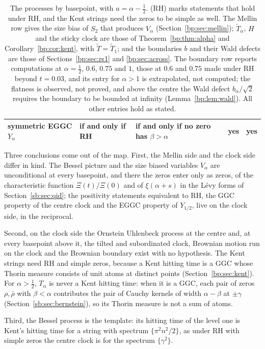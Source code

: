 \begin{table}[htbp]
\begin{tabular}{p{}p{}p{}p{}p{}}
\raggedright symmetric EGGC $Y_\alpha$ & \raggedright if and only if RH & \raggedright if and only if no zero has $\beta>\alpha$ & \raggedright yes & yes\tabularnewline
\bottomrule
\end{tabular}
\caption{The processes by basepoint, with $a=\alpha-\frac12$. (RH) marks statements that hold under RH, and the Kent strings need the zeros to be simple as well. The Mellin row gives the size bias of $S_2$ that produces $V_\alpha$ (Section~\ref{bp:sec:mellin}); $\widetilde T_\alpha$, $H$ and the sticky clock are those of Theorem~\ref{bp:thm:alpha} and Corollary~\ref{bp:cor:kent}, with $\widetilde T=\widetilde T_1$; and the boundaries $b$ and their Wald defects are those of Sections~\ref{bp:sec:rs1} and \ref{bp:sec:across}. The boundary row reports computations at $\alpha=\frac12$, $0.6$, $0.75$ and $1$, those at $0.6$ and $0.75$ made under RH beyond $t=0.03$, and its entry for $\alpha>1$ is extrapolated, not computed; the flatness is observed, not proved, and above the centre the Wald defect $b_\alpha/\sqrt2$ requires the boundary to be bounded at infinity (Lemma~\ref{bp:lem:wald}). All other entries hold as stated.}
\label{pm:tab:map}
\end{table}

Three conclusions come out of the map. First, the Mellin side and the clock side differ in kind. The Bessel picture and the size biased variables $V_\alpha$ are unconditional at every basepoint, and there the zeros enter only as zeros, of the characteristic function $\Xi(t)/\Xi(0)$ and of $\xi(\alpha+s)$ in the L\'evy forms of Section~\ref{sb:sec:qid}; the positivity statements equivalent to RH, the GGC property of the centre clock and the EGGC property of $Y_{1/2}$, live on the clock side, in the reciprocal.

Second, on the clock side the Ornstein Uhlenbeck process at the centre and, at every basepoint above it, the tilted and subordinated clock, Brownian motion run on the clock and the Brownian boundary exist with no hypothesis. The Kent strings need RH and simple zeros, because a Kent hitting time is a GGC whose Thorin measure consists of unit atoms at distinct points (Section~\ref{bp:sec:kent}). For $\alpha>\frac12$, $T_\alpha$ is never a Kent hitting time: when it is a GGC, each pair of zeros $\rho,\bar\rho$ with $\beta<\alpha$ contributes the pair of Cauchy kernels of width $\alpha-\beta$ at $\pm\gamma$ (Section~\ref{sb:sec:bernstein}), so its Thorin measure is not a sum of atoms.

Third, the Bessel process is the template: its hitting time of the level one is Kent's hitting time for a string with spectrum $\{\pi^2n^2/2\}$, as under RH with simple zeros the centre clock is for the spectrum $\{\gamma^2\}$.
